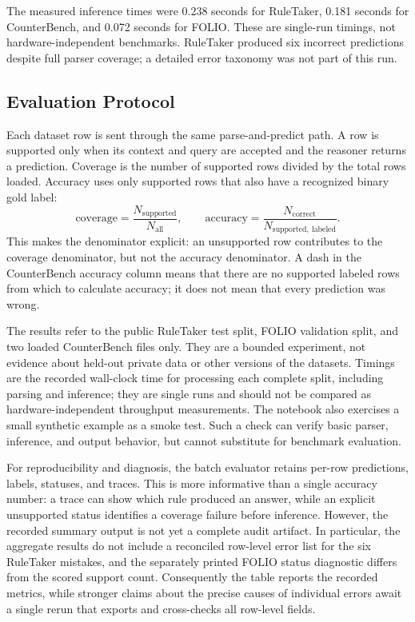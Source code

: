\documentclass[10pt,twocolumn,letterpaper]{article}
\begin{document}
The measured inference times were 0.238 seconds for RuleTaker, 0.181 seconds for CounterBench, and 0.072 seconds for FOLIO. These are single-run timings, not hardware-independent benchmarks. RuleTaker produced six incorrect predictions despite full parser coverage; a detailed error taxonomy was not part of this run.

\subsection{Evaluation Protocol}
Each dataset row is sent through the same parse-and-predict path. A row is supported only when its context and query are accepted and the reasoner returns a prediction. Coverage is the number of supported rows divided by the total rows loaded. Accuracy uses only supported rows that also have a recognized binary gold label:
\[
\mathrm{coverage}=\frac{N_{\mathrm{supported}}}{N_{\mathrm{all}}},\qquad
\mathrm{accuracy}=\frac{N_{\mathrm{correct}}}{N_{\mathrm{supported,\ labeled}}}.
\]
This makes the denominator explicit: an unsupported row contributes to the coverage denominator, but not the accuracy denominator. A dash in the CounterBench accuracy column means that there are no supported labeled rows from which to calculate accuracy; it does not mean that every prediction was wrong.

The results refer to the public RuleTaker test split, FOLIO validation split, and two loaded CounterBench files only. They are a bounded experiment, not evidence about held-out private data or other versions of the datasets. Timings are the recorded wall-clock time for processing each complete split, including parsing and inference; they are single runs and should not be compared as hardware-independent throughput measurements. The notebook also exercises a small synthetic example as a smoke test. Such a check can verify basic parser, inference, and output behavior, but cannot substitute for benchmark evaluation.

For reproducibility and diagnosis, the batch evaluator retains per-row predictions, labels, statuses, and traces. This is more informative than a single accuracy number: a trace can show which rule produced an answer, while an explicit unsupported status identifies a coverage failure before inference. However, the recorded summary output is not yet a complete audit artifact. In particular, the aggregate results do not include a reconciled row-level error list for the six RuleTaker mistakes, and the separately printed FOLIO status diagnostic differs from the scored support count. Consequently the table reports the recorded metrics, while stronger claims about the precise causes of individual errors await a single rerun that exports and cross-checks all row-level fields.
\end{document}
